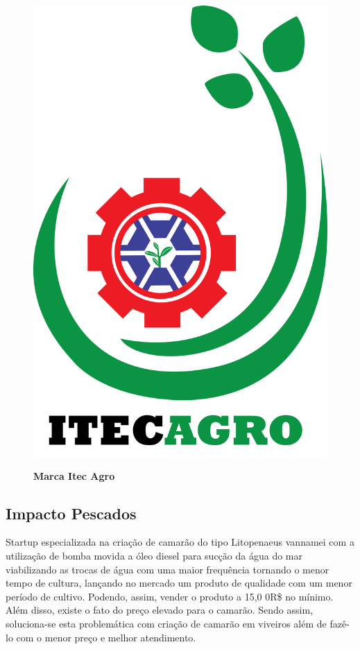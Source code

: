 \begin{figure}[!htb]
\centering
\caption{\textbf{Marca Itec Agro}}
\includegraphics[scale=0.15]{Imagens/itecagro.png}
\label{figura_46}
\end{figure}
\newpage

\subsection{Impacto Pescados}

Startup especializada na criação de camarão do tipo Litopenaeus vannamei com a utilização de bomba movida a óleo diesel para sucção da água do mar viabilizando as trocas de água com uma maior frequência tornando o menor tempo de cultura, lançando no mercado um produto de qualidade com um menor período de cultivo. Podendo, assim, vender o produto a 15,0 0R\$ no mínimo. Além disso, existe o fato do preço elevado para o camarão. Sendo assim, soluciona-se esta problemática com criação de camarão em viveiros além de fazê-lo com o menor preço e melhor atendimento. 

